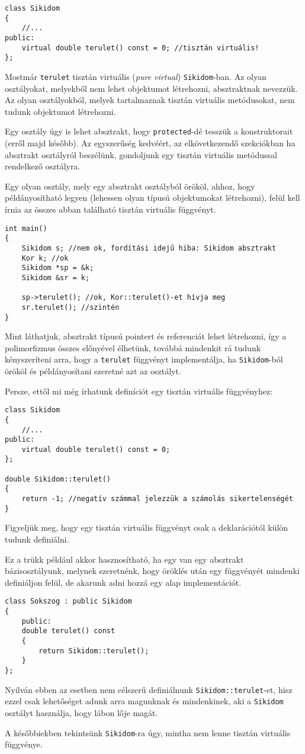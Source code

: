 \documentclass[a4paper,11.5pt,table]{article}
\begin{document}
\begin{lstlisting}
class Sikidom
{
	//...
public:
	virtual double terulet() const = 0; //tisztán virtuális!
};
\end{lstlisting}
	Mostmár \texttt{terulet} tisztán virtuális (\textit{pure virtual}) \texttt{Sikidom}-ban. Az olyan osztályokat, melyekből nem lehet objektumot létrehozni, absztraktnak nevezzük. Az olyan osztályokból, melyek tartalmaznak tisztán virtuális metódusokat, nem tudunk objektumot létrehozni.
	\begin{note}
		Egy osztály úgy is lehet absztrakt, hogy \texttt{protected}-dé tesszük a konstruktorait (erről majd később). Az egyszerűség kedvéért, az elkövetkezendő szekciókban ha absztrakt osztályról beszélünk, gondoljunk egy tisztán virtuális metódussal rendelkező osztályra.
	\end{note}
	Egy olyan osztály, mely egy absztrakt osztályból örököl, ahhoz, hogy példányosítható legyen (lehessen olyan típusú objektumokat létrehozni), felül kell írnia az összes abban található tisztán virtuális függvényt.
	\begin{lstlisting}
int main()
{
	Sikidom s; //nem ok, fordítási idejű hiba: Sikidom absztrakt
	Kor k; //ok
	Sikidom *sp = &k;
	Sikidom &sr = k;
	
	sp->terulet(); //ok, Kor::terulet()-et hívja meg
	sr.terulet(); //szintén
}
	\end{lstlisting}
	Mint láthatjuk, absztrakt típusú pointert és referenciát lehet létrehozni, így a polimorfizmus összes előnyével élhetünk, továbbá mindenkit rá tudunk kényszeríteni arra, hogy a \texttt{terulet} függvényt implementálja, ha \texttt{Sikidom}-ból örököl és példányosítani szeretné azt az osztályt.
	
	Persze, ettől mi még írhatunk definíciót egy tisztán virtuális függvényhez:
\begin{lstlisting}
class Sikidom
{
	//...
public:
	virtual double terulet() const = 0;
};

double Sikidom::terulet()
{
	return -1; //negatív számmal jelezzük a számolás sikertelenségét
}
\end{lstlisting}
	Figyeljük meg, hogy egy tisztán virtuális függvényt csak a deklarációtól külön tudunk definiálni. 
	
	Ez a trükk például akkor hasznosítható, ha egy van egy absztrakt bázisosztályunk, melynek szeretnénk, hogy öröklés után egy függvényét mindenki definiáljon felül, de akarunk adni hozzá egy alap implementációt.
\begin{lstlisting}
class Sokszog : public Sikidom
{
	public:
	double terulet() const
	{
		return Sikidom::terulet();
	}
};
\end{lstlisting}
	\begin{note}
		Nyilván ebben az esetben nem célszerű definiálnunk \texttt{Sikidom::terulet}-et, hisz ezzel csak lehetőséget adunk arra magunknak és mindenkinek, aki a \texttt{Sikidom} osztályt használja, hogy lábon lője magát.
	\end{note}
	A későbbiekben tekintsünk \texttt{Sikidom}-ra úgy, mintha nem lenne tisztán virtuális függvénye.
\end{document}
